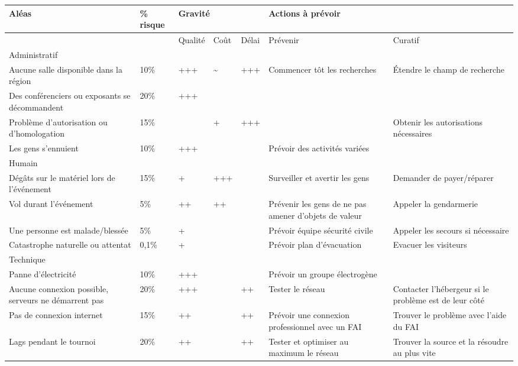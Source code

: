 \documentclass[french]{article}
\begin{document}
\newpage
\begin{adjustbox}{center}
\begin{tabularx}{17cm}{|X||p{}||p{1cm}|p{}|p{}||X|X|}
	\hline
		Aléas & \% risque & \multicolumn{3}{l||}{Gravité} & \multicolumn{2}{l|}{Actions à prévoir} \\
	\hline
		 & & Qualité & Coût & Délai & Prévenir & Curatif \\
	\hline
	\hline
		\multicolumn{7}{|l|}{Administratif}\\
	\hline
	\hline
		Aucune salle disponible dans la région & 10\% & +++ & \textasciitilde & +++ & Commencer tôt les recherches & Étendre le champ de recherche \\
	\hline
		Des conférenciers ou exposants se décommandent & 20\% & +++ & & & & \\
	\hline
    	Problème d'autorisation ou d'homologation & 15\% & & + & +++ &  & Obtenir les autorisations nécessaires \\
    \hline
		Les gens s'ennuient & 10\% & +++ & & & Prévoir des activités variées & \\
	\hline
    \hline
		\multicolumn{7}{|l|}{Humain}\\
    \hline
	\hline
    	Dégâts sur le matériel lors de l'événement & 15\% & + & +++ & & Surveiller et avertir les gens & Demander de payer/réparer \\
	\hline
		Vol durant l'événement & 5\% & ++ & ++ & & Prévenir les gens de ne pas amener d'objets de valeur & Appeler la gendarmerie \\
    \hline
		Une personne est malade/blessée & 5\% & + & & & Prévoir équipe sécurité civile & Appeler les secours si nécessaire\\
    \hline
		Catastrophe naturelle ou attentat & 0,1\% & + & & & Prévoir plan d'évacuation & Evacuer les visiteurs\\
	\hline
    \hline
		\multicolumn{7}{|l|}{Technique}\\
	\hline
	\hline
		Panne d'électricité & 10\% & +++ & & & Prévoir un groupe électrogène & \\
	\hline
		Aucune connexion possible, serveurs ne démarrent pas & 20\% & +++ & & ++ & Tester le réseau & Contacter l'hébergeur si le problème est de leur côté\\
	\hline
		Pas de connexion internet & 15\% & ++ & & ++ & Prévoir une connexion professionnel avec un FAI & Trouver le problème avec l'aide du FAI \\
	\hline
		Lags pendant le tournoi & 20\% & ++ & & ++ & Tester et optimiser au maximum le réseau & Trouver la source et la résoudre au plus vite \\
	\hline
\end{tabularx}
\end{adjustbox}
\end{document}
